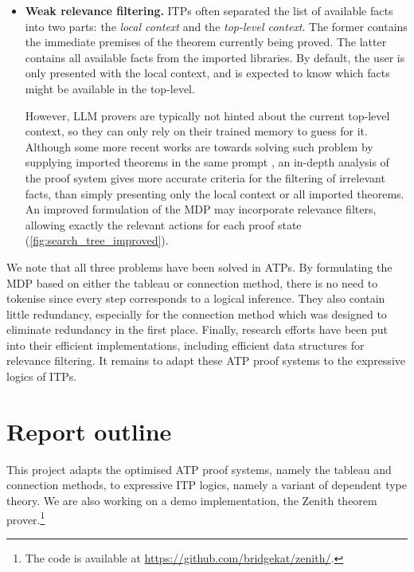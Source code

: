 \documentclass[twoside]{report}
\begin{document}
\begin{itemize}
    \item \textbf{Weak relevance filtering.} ITPs often separated the list of available facts into two parts: the \emph{local context} and the \emph{top-level context}. The former contains the immediate premises of the theorem currently being proved. The latter contains all available facts from the imported libraries. By default, the user is only presented with the local context, and is expected to know which facts might be available in the top-level.

          However, LLM provers are typically not hinted about the current top-level context, so they can only rely on their trained memory to guess for it. Although some more recent works are towards solving such problem by supplying imported theorems in the same prompt \cite{hu2024minictx}, an in-depth analysis of the proof system gives more accurate criteria for the filtering of irrelevant facts, than simply presenting only the local context or all imported theorems. An improved formulation of the MDP may incorporate relevance filters, allowing exactly the relevant actions for each proof state (\cref{fig:search_tree_improved}).
\end{itemize}

We note that all three problems have been solved in ATPs. By formulating the MDP based on either the tableau or connection method, there is no need to tokenise since every step corresponds to a logical inference. They also contain little redundancy, especially for the connection method which was designed to eliminate redundancy in the first place. Finally, research efforts have been put into their efficient implementations, including efficient data structures for relevance filtering. It remains to adapt these ATP proof systems to the expressive logics of ITPs.


\section{Report outline}
\label{sec:report_outline}

This project adapts the optimised ATP proof systems, namely the tableau and connection methods, to expressive ITP logics, namely a variant of dependent type theory. We are also working on a demo implementation, the Zenith theorem prover.\footnote{The code is available at \url{https://github.com/bridgekat/zenith/}.}
\end{document}
